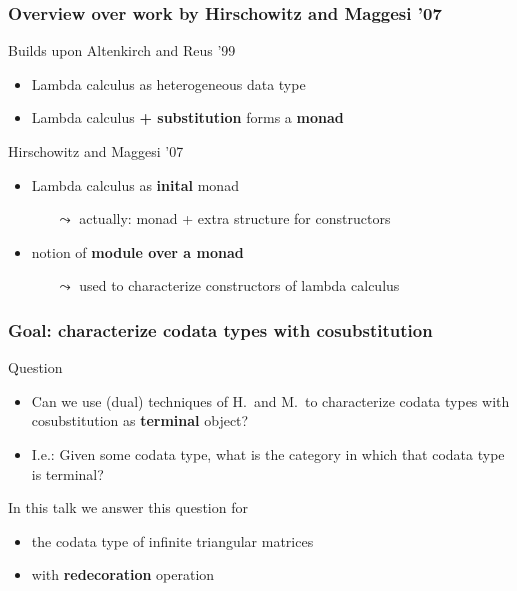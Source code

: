 \documentclass[
serif,
mathsans,
]
{beamer}
\newcommand{\fat}[1]{\textbf{#1}}
\begin{document}
\begin{frame}
 \frametitle{Overview over work by Hirschowitz and Maggesi '07}
 \begin{block}{Builds upon Altenkirch and Reus '99}
  \begin{itemize}
   \item Lambda calculus as heterogeneous data type
   \item Lambda calculus \fat{+ substitution} forms a \fat{monad}
  \end{itemize}
 \end{block}

\begin{block}{Hirschowitz and Maggesi '07}
 \begin{itemize}
  \item Lambda calculus as \fat{inital} monad 
     \begin{itemize}
       \item [$\leadsto$]actually: monad + extra structure for constructors
     \end{itemize}
  \item notion of \fat{module over a monad} 
     \begin{itemize}
        \item [$\leadsto$]used to characterize constructors of lambda calculus
     \end{itemize}
 \end{itemize}
\end{block}
\end{frame}


\begin{frame}
 \frametitle{Goal: characterize \fat{co}data types with \fat{co}substitution}
 
\begin{block}{Question}
  \begin{itemize}
    \item 
        Can we use (dual) techniques of H.\ and M.\ to characterize codata types with cosubstitution as
        \fat{terminal} object?
    \item I.e.: Given some codata type, what is the category in which that codata type is terminal?
  \end{itemize}
\end{block}
  
\begin{block}{In this talk}
 we answer this question for 
  \begin{itemize} 
    \item the codata type of infinite triangular matrices
    \item with \fat{redecoration} operation
  \end{itemize}
\end{block}

 
\end{frame}
\end{document}
